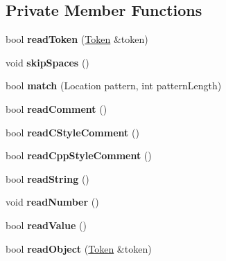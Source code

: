 \subsection*{Private Member Functions}
\begin{DoxyCompactItemize}
\item 
\mbox{\label{classJson_1_1Reader_a7cb0631963cc0fd4ff6ed0f570976864}} 
bool {\bfseries read\+Token} (\hyperlink{classJson_1_1Reader_1_1Token}{Token} \&token)
\item 
\mbox{\label{classJson_1_1Reader_a40d0f69d15aeb2d52ff78d794f5ab8b2}} 
void {\bfseries skip\+Spaces} ()
\item 
\mbox{\label{classJson_1_1Reader_a3e5a7bc6b7b53f2ca8cb9da42f8ffb21}} 
bool {\bfseries match} (Location pattern, int pattern\+Length)
\item 
\mbox{\label{classJson_1_1Reader_ad2690e860a1b3332c5401fb0850ba065}} 
bool {\bfseries read\+Comment} ()
\item 
\mbox{\label{classJson_1_1Reader_ae0ffe796abdc3c5851589ee500e28c79}} 
bool {\bfseries read\+C\+Style\+Comment} ()
\item 
\mbox{\label{classJson_1_1Reader_a6716ef6290b0f469efaf8d379c357967}} 
bool {\bfseries read\+Cpp\+Style\+Comment} ()
\item 
\mbox{\label{classJson_1_1Reader_a6328a0b1994e05118886f9fc9c608643}} 
bool {\bfseries read\+String} ()
\item 
\mbox{\label{classJson_1_1Reader_afb31bfda6bb27d6453057a47655e8363}} 
void {\bfseries read\+Number} ()
\item 
\mbox{\label{classJson_1_1Reader_a47e56844b803d41ec993a83fadf4495c}} 
bool {\bfseries read\+Value} ()
\item 
\mbox{\label{classJson_1_1Reader_a0068eb3d8e86e91f0e4806f60da66b9c}} 
bool {\bfseries read\+Object} (\hyperlink{classJson_1_1Reader_1_1Token}{Token} \&token)
\item 

\end{DoxyCompactItemize}
